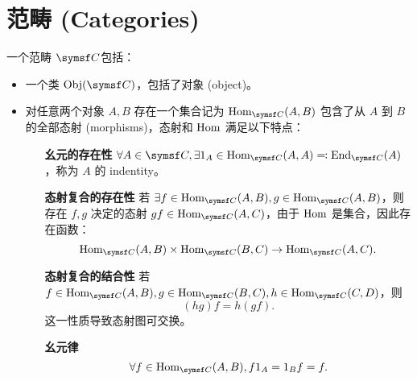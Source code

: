 \section{范畴 (Categories)}



一个范畴 \(\symsf C\)包括：
\begin{itemize}
    \item 一个类 \(\Obj(\symsf C)\)，包括了对象 (object)。
    \item 对任意两个对象 \(A,B\) 存在一个集合记为 \(\Hom_{\symsf C}(A,B)\) 包含了从 \(A\) 到 \(B\) 的全部态射 (morphisms)，态射和 \(\operatorname{Hom}\) 满足以下特点：
          \begin{itemize}
              \item[\textbf{幺元的存在性}] \(\forall A\in \symsf C,\exists 1_A \in \Hom_{\symsf C}(A,A) \eqcolon \End_{\symsf C}(A)\)，称为 \(A\) 的 indentity。
              \item[\textbf{态射复合的存在性}] 若 \(\exists f\in \Hom_{\symsf C}(A,B), g\in \Hom_{\symsf C}(A,B)\)，则存在 \(f,g\) 决定的态射 \(gf\in \Hom_{\symsf C}(A,C)\)，由于 \(\operatorname{Hom}\) 是集合，因此存在函数：
                  \[
                      \Hom_{\symsf C}(A,B) \times \Hom_{\symsf C}(B,C) \to \Hom_{\symsf C}(A,C)
                      .\]
              \item[\textbf{态射复合的结合性}] 若 \(f\in \Hom_{\symsf C}(A,B), g\in \Hom_{\symsf C}(B,C), h\in \Hom_{\symsf C}(C,D)\)，则
                  \[
                      (hg)f = h(gf)
                      .\]
                  这一性质导致态射图可交换。
              \item [\textbf{幺元律}]\[
                        \forall f\in \Hom_{\symsf C}(A,B),f 1_A = 1_Bf=f
                        .\]
          \end{itemize}
\end{itemize}

